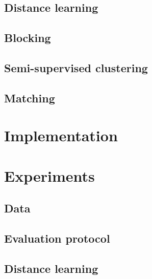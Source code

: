 \documentclass{article}
\begin{document}
\subsection{Distance learning}

\subsection{Blocking}

\subsection{Semi-supervised clustering}

\subsection{Matching}



\section{Implementation}
\label{implementation}



\section{Experiments}
\label{experiments}

\subsection{Data}

\subsection{Evaluation protocol}

\subsection{Distance learning}
\end{document}
